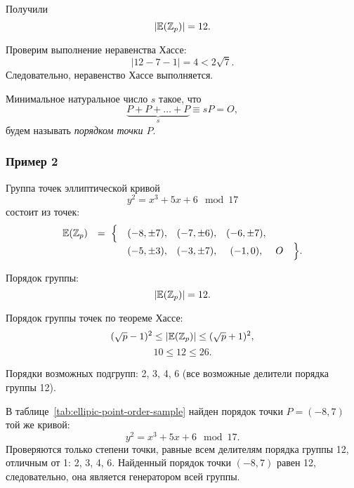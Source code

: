 Получили
    \[ |\mathbb{E}(\mathbb{Z}_p)| = 12. \]

Проверим выполнение неравенства Хассе:
    \[ \left| 12 - 7 - 1 \right| = 4 < 2 \sqrt{7}. \]
Следовательно, неравенство Хассе выполняется.

Минимальное натуральное число $s$ такое, что
\[ \underbrace{P + P + \ldots + P}_{s} \equiv s P = O, \]
будем называть \emph{порядком точки $P$}.


\subsubsection{Пример 2}

Группа точек эллиптической кривой
    \[ y^2 = x^3 + 5 x + 6 \mod 17 \]
состоит из точек:
\[ \begin{array}{ccccccc}
    \mathbb{E}(\mathbb{Z}_p) & =~ \Big\{ & (-8, \pm 7), & (-7, \pm 6), & (-6, \pm 7), &   & \\
             &           & (-5, \pm 3), & (-3, \pm 7), & (-1, 0),     & O & \Big\}. \\
\end{array} \]

Порядок группы:
    \[ |\mathbb{E}(\mathbb{Z}_p)| = 12. \]

Порядок группы точек по теореме Хассе:
    \[ (\sqrt{p}-1)^2 \leq |\mathbb{E}(\mathbb{Z}_p)| \leq (\sqrt{p}+1)^2, \]
    \[ 10 \leq 12 \leq 26. \]

Порядки возможных подгрупп: 2, 3, 4, 6 (все возможные делители порядка группы 12).

В таблице~\ref{tab:ellipic-point-order-sample} найден порядок точки $P = (-8, 7)$ той же кривой:
    \[ y^2 = x^3 + 5 x + 6 \mod 17. \]
Проверяются только степени точки, равные всем делителям порядка группы 12, отличным от 1: 2, 3, 4, 6. Найденный порядок точки $(-8,7)$ равен 12, следовательно, она является генератором всей группы.

